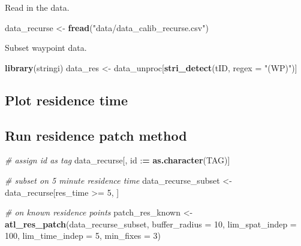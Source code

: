 \documentclass[
]{scrreprt}
\newenvironment{Shaded}{}{}
\newcommand{\CommentTok}[1]{\textcolor[rgb]{0.38,0.63,0.69}{\textit{#1}}}
\newcommand{\DataTypeTok}[1]{\textcolor[rgb]{0.56,0.13,0.00}{#1}}
\newcommand{\DecValTok}[1]{\textcolor[rgb]{0.25,0.63,0.44}{#1}}
\newcommand{\ErrorTok}[1]{\textcolor[rgb]{1.00,0.00,0.00}{\textbf{#1}}}
\newcommand{\KeywordTok}[1]{\textcolor[rgb]{0.00,0.44,0.13}{\textbf{#1}}}
\newcommand{\NormalTok}[1]{#1}
\newcommand{\OperatorTok}[1]{\textcolor[rgb]{0.40,0.40,0.40}{#1}}
\newcommand{\StringTok}[1]{\textcolor[rgb]{0.25,0.44,0.63}{#1}}
\begin{document}
Read in the data.

\begin{Shaded}
\begin{Highlighting}[]
\NormalTok{data\_recurse <{-}}\StringTok{ }\KeywordTok{fread}\NormalTok{(}\StringTok{"data/data\_calib\_recurse.csv"}\NormalTok{)}
\end{Highlighting}
\end{Shaded}

Subset waypoint data.

\begin{Shaded}
\begin{Highlighting}[]
\KeywordTok{library}\NormalTok{(stringi)}
\NormalTok{data\_res <{-}}\StringTok{ }\NormalTok{data\_unproc[}\KeywordTok{stri\_detect}\NormalTok{(tID, }\DataTypeTok{regex =} \StringTok{"(WP)"}\NormalTok{)]}
\end{Highlighting}
\end{Shaded}

\hypertarget{plot-residence-time}{%
\subsection{Plot residence time}\label{plot-residence-time}}

\hypertarget{run-residence-patch-method}{%
\subsection{Run residence patch method}\label{run-residence-patch-method}}

\begin{Shaded}
\begin{Highlighting}[]
\CommentTok{\# assign id as tag}
\NormalTok{data\_recurse[, id }\OperatorTok{:}\ErrorTok{=}\StringTok{ }\KeywordTok{as.character}\NormalTok{(TAG)]}

\CommentTok{\# subset on 5 minute residence time}
\NormalTok{data\_recurse\_subset <{-}}\StringTok{ }\NormalTok{data\_recurse[res\_time }\OperatorTok{>=}\StringTok{ }\DecValTok{5}\NormalTok{, ]}

\CommentTok{\# on known residence points}
\NormalTok{patch\_res\_known <{-}}\StringTok{ }\KeywordTok{atl\_res\_patch}\NormalTok{(data\_recurse\_subset, }
                                \DataTypeTok{buffer\_radius =} \DecValTok{10}\NormalTok{,}
                                \DataTypeTok{lim\_spat\_indep =} \DecValTok{100}\NormalTok{,}
                                \DataTypeTok{lim\_time\_indep =} \DecValTok{5}\NormalTok{,}
                                \DataTypeTok{min\_fixes =} \DecValTok{3}\NormalTok{)}
\end{Highlighting}
\end{Shaded}
\end{document}
